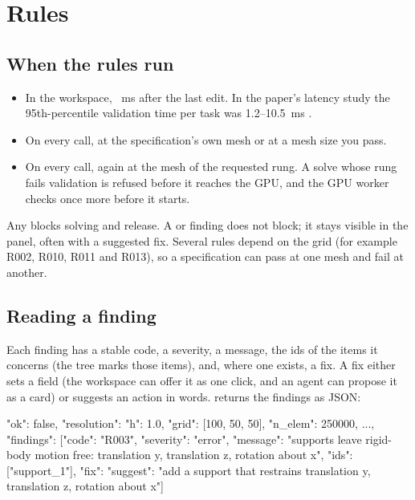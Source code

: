 \chapter{Rules}\label{ch:rules}

\section{When the rules run}
\begin{itemize}
  \item In the workspace, \CheckDelay~ms after the last edit. In the paper's latency study the 95th-percentile
  validation time per task was 1.2--10.5~ms .
  \item On every  call, at the specification's own mesh or at a mesh size  you pass.
  \item On every  call, again at the mesh of the requested rung. A solve whose rung fails validation is
  refused before it reaches the GPU, and the GPU worker checks once more before it starts.
\end{itemize}

Any  blocks solving and release. A  or  finding does not block; it stays visible in
the  panel, often with a suggested fix. Several rules depend on the grid (for example R002, R010, R011 and
R013), so a specification can pass at one mesh and fail at another.

\section{Reading a finding}
Each finding has a stable code, a severity, a message, the ids of the items it concerns (the tree marks those items),
and, where one exists, a fix. A fix either sets a field (the workspace can offer it as one click, and an agent can
propose it as a card) or suggests an action in words.  returns the findings as JSON:

\begin{jsoncode}
{"ok": false,
 "resolution": {"h": 1.0, "grid": [100, 50, 50], "n_elem": 250000, ...},
 "findings": [{"code": "R003", "severity": "error",
   "message": "supports leave rigid-body motion free: translation y, translation z, rotation about x",
   "ids": ["support_1"],
   "fix": {"suggest": "add a support that restrains translation y, translation z, rotation about x"}}]}
\end{jsoncode}

